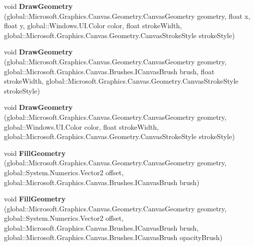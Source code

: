 \begin{DoxyCompactItemize}
void {\bfseries Draw\+Geometry} (global\+::\+Microsoft.\+Graphics.\+Canvas.\+Geometry.\+Canvas\+Geometry geometry, float x, float y, global\+::\+Windows.\+U\+I.\+Color color, float stroke\+Width, global\+::\+Microsoft.\+Graphics.\+Canvas.\+Geometry.\+Canvas\+Stroke\+Style stroke\+Style)
\item 
\mbox{\label{class_microsoft_1_1_graphics_1_1_canvas_1_1_canvas_drawing_session_a3ae15bd542556f05f5da92ab7dbe7d62}} 
void {\bfseries Draw\+Geometry} (global\+::\+Microsoft.\+Graphics.\+Canvas.\+Geometry.\+Canvas\+Geometry geometry, global\+::\+Microsoft.\+Graphics.\+Canvas.\+Brushes.\+I\+Canvas\+Brush brush, float stroke\+Width, global\+::\+Microsoft.\+Graphics.\+Canvas.\+Geometry.\+Canvas\+Stroke\+Style stroke\+Style)
\item 
\mbox{\label{class_microsoft_1_1_graphics_1_1_canvas_1_1_canvas_drawing_session_a2bbd4068f7c607d0644555f1e6268edb}} 
void {\bfseries Draw\+Geometry} (global\+::\+Microsoft.\+Graphics.\+Canvas.\+Geometry.\+Canvas\+Geometry geometry, global\+::\+Windows.\+U\+I.\+Color color, float stroke\+Width, global\+::\+Microsoft.\+Graphics.\+Canvas.\+Geometry.\+Canvas\+Stroke\+Style stroke\+Style)
\item 
\mbox{\label{class_microsoft_1_1_graphics_1_1_canvas_1_1_canvas_drawing_session_a84e8200e7ed30c69d67bebf3d87953a4}} 
void {\bfseries Fill\+Geometry} (global\+::\+Microsoft.\+Graphics.\+Canvas.\+Geometry.\+Canvas\+Geometry geometry, global\+::\+System.\+Numerics.\+Vector2 offset, global\+::\+Microsoft.\+Graphics.\+Canvas.\+Brushes.\+I\+Canvas\+Brush brush)
\item 
\mbox{\label{class_microsoft_1_1_graphics_1_1_canvas_1_1_canvas_drawing_session_aad5da577208ccdc82b33878e8418942f}} 
void {\bfseries Fill\+Geometry} (global\+::\+Microsoft.\+Graphics.\+Canvas.\+Geometry.\+Canvas\+Geometry geometry, global\+::\+System.\+Numerics.\+Vector2 offset, global\+::\+Microsoft.\+Graphics.\+Canvas.\+Brushes.\+I\+Canvas\+Brush brush, global\+::\+Microsoft.\+Graphics.\+Canvas.\+Brushes.\+I\+Canvas\+Brush opacity\+Brush)
\item 
\mbox{\label{class_microsoft_1_1_graphics_1_1_canvas_1_1_canvas_drawing_session_ac1e61251a101f5c7bfa364523abf1828}} 

\end{DoxyCompactItemize}
